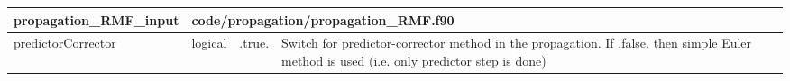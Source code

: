 \documentclass{article}
\begin{document}

\begin{longtable}{llll}
\toprule
\textbf{\large{propagation\_RMF\_input}} & \multicolumn{3}{l}{\footnotesize{code/propagation/propagation\_RMF.f90}}\\*
\midrule
\endfirsthead
\midrule
\endhead
predictorCorrector & \begin{minipage}[t]{2cm}logical\end{minipage} & \begin{minipage}[t]{2cm}.true.\end{minipage} & \begin{minipage}[t]{12cm}Switch for predictor-corrector method in the propagation. If .false. then simple Euler method is used (i.e. only predictor step is done)\end{minipage}\\*
\bottomrule
\end{longtable}
{ }



\end{document}
